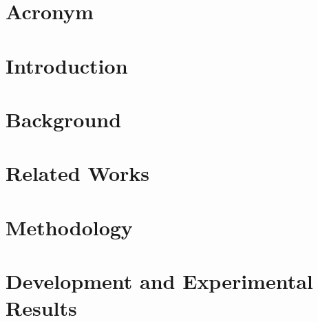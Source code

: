 \documentclass[12pt,twoside,numbers=endperiod]{scrreprt}
\begin{document}






% 



\setcounter{secnumdepth}{3}
\setcounter{tocdepth}{3}
\label{TableOfContents} \tableofcontents

\label{ListOfFigures} \listoffigures

\label{ListOfTables} \listoftables

\chapter*{Acronym} \label{Acronym}

\newpage


\chapter{Introduction} \label{Introduction}


\chapter{Background} \label{Background}


\chapter{Related Works} \label{RelatedWorks}


\chapter{Methodology} \label{Methodology}


\chapter{Development and Experimental Results} \label{Results}

\newpage

\pagestyle{conclusion}
\end{document}
